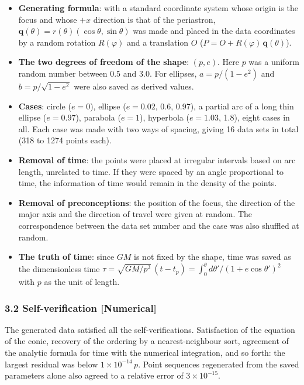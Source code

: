 \documentclass[
  a4paper,
]{article}
\providecommand{\tightlist}{%
  \setlength{\itemsep}{0pt}\setlength{\parskip}{0pt}}
\begin{document}
\begin{itemize}
\tightlist
\item
  \textbf{Generating formula}: with a standard coordinate system whose
  origin is the focus and whose \(+x\) direction is that of the
  periastron, \(\mathbf q(\theta)=r(\theta)(\cos\theta,\sin\theta)\) was
  made and placed in the data coordinates by a random rotation
  \(R(\varphi)\) and a translation \(O\)
  (\(P=O+R(\varphi)\,\mathbf q(\theta)\)).
\item
  \textbf{The two degrees of freedom of the shape}: \((p, e)\). Here
  \(p\) was a uniform random number between 0.5 and 3.0. For ellipses,
  \(a=p/(1-e^2)\) and \(b=p/\sqrt{1-e^2}\) were also saved as derived
  values.
\item
  \textbf{Cases}: circle (\(e=0\)), ellipse (\(e=0.02\), 0.6, 0.97), a
  partial arc of a long thin ellipse (\(e=0.97\)), parabola (\(e=1\)),
  hyperbola (\(e=1.03\), 1.8), eight cases in all. Each case was made
  with two ways of spacing, giving 16 data sets in total (318 to 1274
  points each).
\item
  \textbf{Removal of time}: the points were placed at irregular
  intervals based on arc length, unrelated to time. If they were spaced
  by an angle proportional to time, the information of time would remain
  in the density of the points.
\item
  \textbf{Removal of preconceptions}: the position of the focus, the
  direction of the major axis and the direction of travel were given at
  random. The correspondence between the data set number and the case
  was also shuffled at random.
\item
  \textbf{The truth of time}: since \(GM\) is not fixed by the shape,
  time was saved as the dimensionless time
  \(\tau=\sqrt{GM/p^3}\,(t-t_p)=\int_0^\theta d\theta'/(1+e\cos\theta')^2\)
  with \(p\) as the unit of length.
\end{itemize}

\subsubsection{3.2 Self-verification
{[}Numerical{]}}\label{self-verification-numerical}

The generated data satisfied all the self-verifications. Satisfaction of
the equation of the conic, recovery of the ordering by a
nearest-neighbour sort, agreement of the analytic formula for time with
the numerical integration, and so forth: the largest residual was below
\(1\times10^{-14}\,p\). Point sequences regenerated from the saved
parameters alone also agreed to a relative error of \(3\times10^{-15}\).
\end{document}
